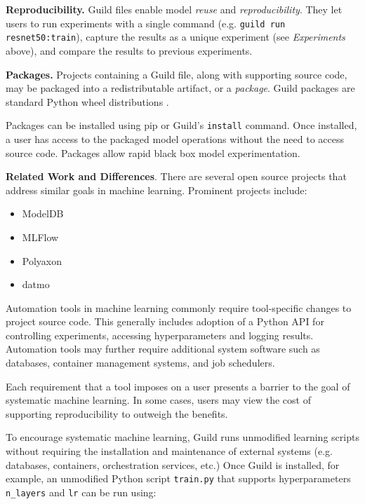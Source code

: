 \documentclass{article}
\begin{document}
\textbf{Reproducibility.} Guild files enable model \emph{reuse} and
\emph{reproducibility}. They let users to run experiments with a
single command (e.g. \texttt{guild run resnet50:train}), capture the
results as a unique experiment (see \emph{Experiments} above), and
compare the results to previous experiments.

\textbf{Packages.} Projects containing a Guild file, along with
supporting source code, may be packaged into a redistributable
artifact, or a \emph{package}. Guild packages are standard Python
wheel distributions \cite{python-dist}.

Packages can be installed using pip \cite{pip} or Guild's
\texttt{install} command. Once installed, a user has access to the
packaged model operations without the need to access source
code. Packages allow rapid black box model experimentation.

\textbf{Related Work and Differences}. There are several open source
projects that address similar goals in machine learning. Prominent
projects include:

\begin{itemize}[noitemsep, topsep=0pt, partopsep=0pt]
\item ModelDB \cite{modeldb}
\item MLFlow \cite{mlflow}
\item Polyaxon \cite{polyaxon}
\item datmo \cite{datmo}
\end{itemize}

Automation tools in machine learning commonly require tool-specific
changes to project source code. This generally includes adoption of a
Python API for controlling experiments, accessing hyperparameters and
logging results. Automation tools may further require additional
system software such as databases, container management systems, and
job schedulers.

Each requirement that a tool imposes on a user presents a barrier to
the goal of systematic machine learning. In some cases, users may view
the cost of supporting reproducibility to outweigh the benefits.

To encourage systematic machine learning, Guild runs unmodified
learning scripts without requiring the installation and maintenance of
external systems (e.g. databases, containers, orchestration services,
etc.) Once Guild is installed, for example, an unmodified Python
script \texttt{train.py} that supports hyperparameters
\texttt{n\_layers} and \texttt{lr} can be run using:
\end{document}
